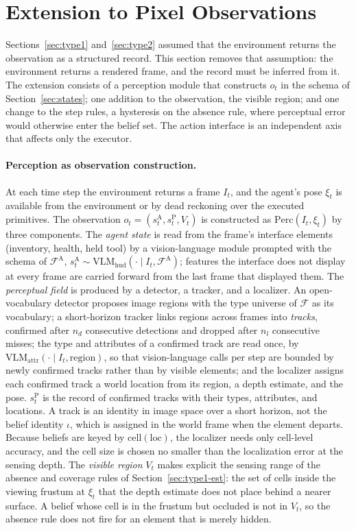 \documentclass[10pt]{article}
\newcommand{\calF}{\mathcal{F}}
\newcommand{\sA}{s^{\mathrm{A}}}
\newcommand{\sP}{s^{\mathrm{P}}}
\newcommand{\FA}{\calF^{\mathrm{A}}}
\newcommand{\loc}{\mathrm{loc}}
\newcommand{\cell}{\mathrm{cell}}
\newcommand{\vlm}[1]{\mathrm{VLM}_{\mathrm{#1}}}
\newcommand{\Perc}{\mathrm{Perc}}
\newcommand{\pose}{\xi}
\newcommand{\Vis}{V}
\begin{document}
\section{Extension to Pixel Observations}
\label{sec:pixels}

Sections~\ref{sec:type1} and~\ref{sec:type2} assumed that the environment returns the observation as a structured record. This section removes that assumption: the environment returns a rendered frame, and the record must be inferred from it. The extension consists of a perception module that constructs $o_t$ in the schema of Section~\ref{sec:states}; one addition to the observation, the visible region; and one change to the step rules, a hysteresis on the absence rule, where perceptual error would otherwise enter the belief set. The action interface is an independent axis that affects only the executor.

\paragraph{Perception as observation construction.}\label{sec:pixels-perc}
At each time step the environment returns a frame $I_t$, and the agent's pose $\pose_t$ is available from the environment or by dead reckoning over the executed primitives. The observation $o_t=(\sA_t,\sP_t,\Vis_t)$ is constructed as $\Perc(I_t,\pose_t)$ by three components. The \emph{agent state} is read from the frame's interface elements (inventory, health, held tool) by a vision-language module prompted with the schema of $\FA$, $\sA_t\sim\vlm{hud}(\cdot\mid I_t,\FA)$; features the interface does not display at every frame are carried forward from the last frame that displayed them. The \emph{perceptual field} is produced by a detector, a tracker, and a localizer. An open-vocabulary detector proposes image regions with the type universe of $\calF$ as its vocabulary; a short-horizon tracker links regions across frames into \emph{tracks}, confirmed after $n_d$ consecutive detections and dropped after $n_l$ consecutive misses; the type and attributes of a confirmed track are read once, by $\vlm{attr}(\cdot\mid I_t,\mathrm{region})$, so that vision-language calls per step are bounded by newly confirmed tracks rather than by visible elements; and the localizer assigns each confirmed track a world location from its region, a depth estimate, and the pose. $\sP_t$ is the record of confirmed tracks with their types, attributes, and locations. A track is an identity in image space over a short horizon, not the belief identity $\iota$, which is assigned in the world frame when the element departs. Because beliefs are keyed by $\cell(\loc)$, the localizer needs only cell-level accuracy, and the cell size is chosen no smaller than the localization error at the sensing depth. The \emph{visible region} $\Vis_t$ makes explicit the sensing range of the absence and coverage rules of Section~\ref{sec:type1-est}: the set of cells inside the viewing frustum at $\pose_t$ that the depth estimate does not place behind a nearer surface. A belief whose cell is in the frustum but occluded is not in $\Vis_t$, so the absence rule does not fire for an element that is merely hidden.
\end{document}
